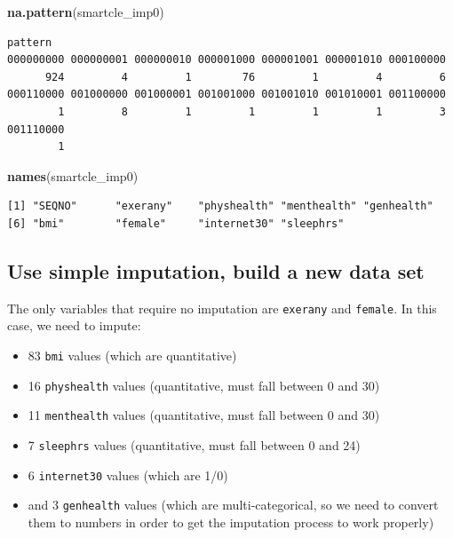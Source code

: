 \documentclass[]{book}
\newenvironment{Shaded}{\begin{snugshade}}{\end{snugshade}}
\newcommand{\KeywordTok}[1]{\textcolor[rgb]{0.13,0.29,0.53}{\textbf{#1}}}
\newcommand{\NormalTok}[1]{#1}
\providecommand{\tightlist}{%
  \setlength{\itemsep}{0pt}\setlength{\parskip}{0pt}}
\theoremstyle{definition}
\theoremstyle{definition}
\theoremstyle{definition}
\theoremstyle{remark}
\begin{document}
\begin{Shaded}
\begin{Highlighting}[]
\KeywordTok{na.pattern}\NormalTok{(smartcle_imp0)}
\end{Highlighting}
\end{Shaded}

\begin{verbatim}
pattern
000000000 000000001 000000010 000001000 000001001 000001010 000100000 
      924         4         1        76         1         4         6 
000110000 001000000 001000001 001001000 001001010 001010001 001100000 
        1         8         1         1         1         1         3 
001110000 
        1 
\end{verbatim}

\begin{Shaded}
\begin{Highlighting}[]
\KeywordTok{names}\NormalTok{(smartcle_imp0)}
\end{Highlighting}
\end{Shaded}

\begin{verbatim}
[1] "SEQNO"      "exerany"    "physhealth" "menthealth" "genhealth" 
[6] "bmi"        "female"     "internet30" "sleephrs"  
\end{verbatim}

\subsection{Use simple imputation, build a new data
set}\label{use-simple-imputation-build-a-new-data-set}

The only variables that require no imputation are \texttt{exerany} and
\texttt{female}. In this case, we need to impute:

\begin{itemize}
\tightlist
\item
  83 \texttt{bmi} values (which are quantitative)
\item
  16 \texttt{physhealth} values (quantitative, must fall between 0 and
  30)
\item
  11 \texttt{menthealth} values (quantitative, must fall between 0 and
  30)
\item
  7 \texttt{sleephrs} values (quantitative, must fall between 0 and 24)
\item
  6 \texttt{internet30} values (which are 1/0)
\item
  and 3 \texttt{genhealth} values (which are multi-categorical, so we
  need to convert them to numbers in order to get the imputation process
  to work properly)
\end{itemize}
\end{document}
